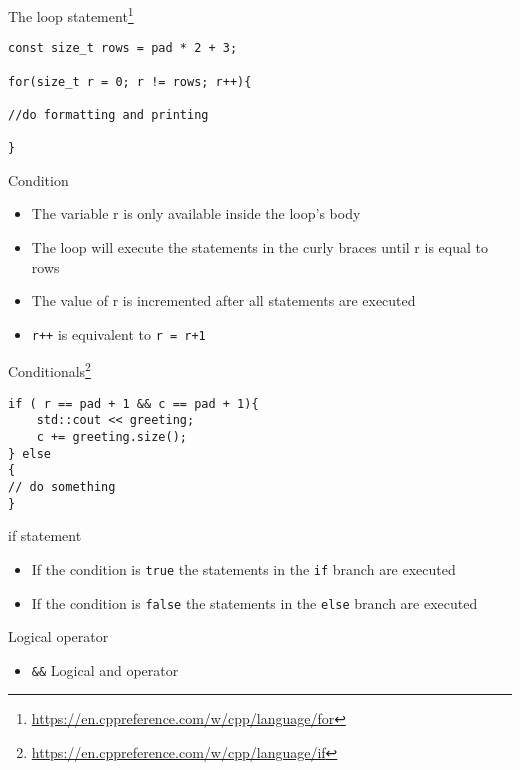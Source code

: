 \documentclass[12pt]{beamer}
\begin{document}
\begin{frame}[fragile]{The loop statement\footnote{\tiny\url{https://en.cppreference.com/w/cpp/language/for}}}
\begin{lstlisting}
const size_t rows = pad * 2 + 3;

for(size_t r = 0; r != rows; r++){

//do formatting and printing

}
\end{lstlisting}
\begin{block}{Condition}
\begin{itemize}
\item The variable r is only available inside the loop's body
\item The loop will execute the statements in the curly braces until r is equal to rows
\item The value of r is incremented after all statements are executed
\item \lstinline|r++| is equivalent to \lstinline|r = r+1|
\end{itemize}
\end{block}


\end{frame}


\begin{frame}[fragile]{Conditionals\footnote{\tiny\url{https://en.cppreference.com/w/cpp/language/if}}}
\begin{lstlisting}
if ( r == pad + 1 && c == pad + 1){
	std::cout << greeting;
    c += greeting.size();
} else
{
// do something
}
\end{lstlisting}
\begin{block}{if statement}
\begin{itemize}
\item If the condition is \lstinline|true| the statements in the \lstinline|if| branch are executed
\item If the condition is \lstinline|false| the statements in the \lstinline|else| branch are executed
\end{itemize}
\end{block}
\begin{block}{Logical operator}
\begin{itemize}
\item \lstinline|&&| Logical and operator
\end{itemize}
\end{block}
\end{frame}
\end{document}
